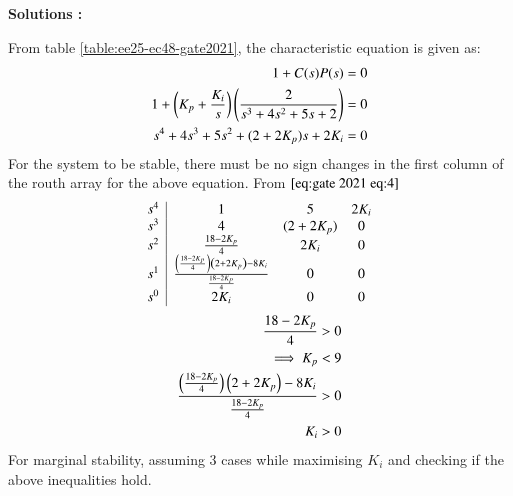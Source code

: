 \documentclass[journal,12pt,onecolumn]{IEEEtran}
\theoremstyle{remark}
\begin{document}
\textbf{Solutions :}
    
    From table \ref{table:ee25-ec48-gate2021}, the characteristic equation is given as:
    \begin{align}
        1+C(s)P(s) &= 0\\
        1+\left(K_p+\frac{K_i}{s}\right)\left(\frac{2}{s^3+4s^2+5s+2}\right) &= 0\\
        s^4+4s^3+5s^2+(2+2K_p)s+2K_i &=0 \label{eq:gate 2021 eq:4}
    \end{align}
    For the system to be stable, there must be no sign changes in the first column of the routh array for the above equation. From $\eqref{eq:gate 2021 eq:4}$
    \begin{align}
    \begin{array}{c|cccc}
        s^4 & 1 & 5 & 2K_i \\
        s^3 & 4 & (2 + 2K_p) & 0 \\
        s^2 & \frac{18-2K_p}{4} & 2K_i & 0 \\
        s^1 &  \frac{\left(\frac{18-2K_p}{4}\right)\left(2 + 2K_p\right)-8K_i}{\frac{18-2K_p}{4}} & 0 & 0\\
        s^0 & 2K_i &0 &0 \\
        \end{array}\\
        \end{align}
        \begin{align}
            \frac{18-2K_p}{4} &> 0\\
            \implies K_p &< 9 \label{eq:gate 2021 eq:1}\\
            \frac{\left(\frac{18-2K_p}{4}\right)\left(2 + 2K_p\right)-8K_i}{\frac{18-2K_p}{4}} &> 0\label{eq:gate 2021 eq:2}\\
        K_i &>0 \label{eq:gate 2021 eq:3}
    \end{align}
    For marginal stability, assuming 3 cases while maximising $K_i$ and checking if the above inequalities hold.
\end{document}

